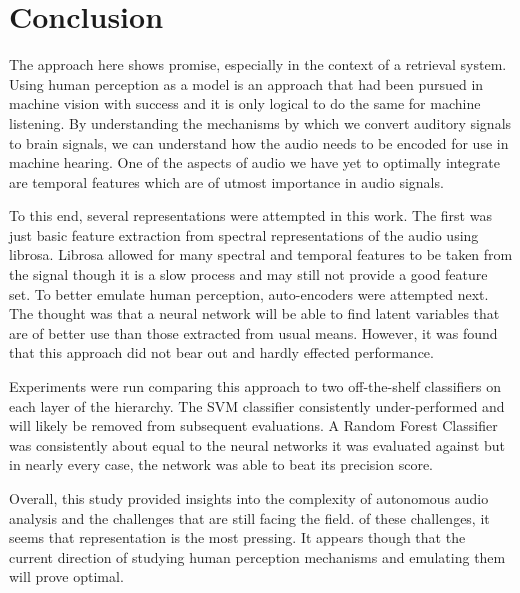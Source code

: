 
\section{Conclusion}
The approach here shows promise, especially in the context of a retrieval
system. Using human perception as a model is an approach that had been pursued
in machine vision with success and it is only logical to do the same for machine
listening. By understanding the mechanisms by which we convert auditory signals
to brain signals, we can understand how the audio needs to be encoded for use in
machine hearing. One of the aspects of audio we have yet to optimally integrate
are temporal features which are of utmost importance in audio signals.

To this end, several representations were attempted in this work. The first was
just basic feature extraction from spectral representations of the audio using
librosa. Librosa allowed for many spectral and temporal features to be taken
from the signal though it is a slow process and may still not provide a good
feature set. To better emulate human perception, auto-encoders were attempted
next. The thought was that a neural network will be able to find latent
variables that are of better use than those extracted from usual means. However,
it was found that this approach did not bear out and hardly effected
performance.

Experiments were run comparing this approach to two off-the-shelf classifiers on
each layer of the hierarchy. The SVM classifier consistently under-performed and
will likely be removed from subsequent evaluations. A Random Forest Classifier
was consistently about equal to the neural networks it was evaluated against but
in nearly every case, the network was able to beat its precision score.

Overall, this study provided insights into the complexity of autonomous audio
analysis and the challenges that are still facing the field. of these
challenges, it seems that representation is the most pressing. It appears though
that the current direction of studying human perception mechanisms and emulating
them will prove optimal.